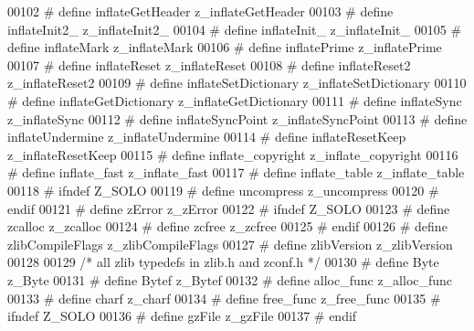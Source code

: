 \begin{DoxyCode}
00102 \textcolor{preprocessor}{#  define inflateGetHeader      z\_inflateGetHeader}
00103 \textcolor{preprocessor}{#  define inflateInit2\_         z\_inflateInit2\_}
00104 \textcolor{preprocessor}{#  define inflateInit\_          z\_inflateInit\_}
00105 \textcolor{preprocessor}{#  define inflateMark           z\_inflateMark}
00106 \textcolor{preprocessor}{#  define inflatePrime          z\_inflatePrime}
00107 \textcolor{preprocessor}{#  define inflateReset          z\_inflateReset}
00108 \textcolor{preprocessor}{#  define inflateReset2         z\_inflateReset2}
00109 \textcolor{preprocessor}{#  define inflateSetDictionary  z\_inflateSetDictionary}
00110 \textcolor{preprocessor}{#  define inflateGetDictionary  z\_inflateGetDictionary}
00111 \textcolor{preprocessor}{#  define inflateSync           z\_inflateSync}
00112 \textcolor{preprocessor}{#  define inflateSyncPoint      z\_inflateSyncPoint}
00113 \textcolor{preprocessor}{#  define inflateUndermine      z\_inflateUndermine}
00114 \textcolor{preprocessor}{#  define inflateResetKeep      z\_inflateResetKeep}
00115 \textcolor{preprocessor}{#  define inflate\_copyright     z\_inflate\_copyright}
00116 \textcolor{preprocessor}{#  define inflate\_fast          z\_inflate\_fast}
00117 \textcolor{preprocessor}{#  define inflate\_table         z\_inflate\_table}
00118 \textcolor{preprocessor}{#  ifndef Z\_SOLO}
00119 \textcolor{preprocessor}{#    define uncompress            z\_uncompress}
00120 \textcolor{preprocessor}{#  endif}
00121 \textcolor{preprocessor}{#  define zError                z\_zError}
00122 \textcolor{preprocessor}{#  ifndef Z\_SOLO}
00123 \textcolor{preprocessor}{#    define zcalloc               z\_zcalloc}
00124 \textcolor{preprocessor}{#    define zcfree                z\_zcfree}
00125 \textcolor{preprocessor}{#  endif}
00126 \textcolor{preprocessor}{#  define zlibCompileFlags      z\_zlibCompileFlags}
00127 \textcolor{preprocessor}{#  define zlibVersion           z\_zlibVersion}
00128 
00129 \textcolor{comment}{/* all zlib typedefs in zlib.h and zconf.h */}
00130 \textcolor{preprocessor}{#  define Byte                  z\_Byte}
00131 \textcolor{preprocessor}{#  define Bytef                 z\_Bytef}
00132 \textcolor{preprocessor}{#  define alloc\_func            z\_alloc\_func}
00133 \textcolor{preprocessor}{#  define charf                 z\_charf}
00134 \textcolor{preprocessor}{#  define free\_func             z\_free\_func}
00135 \textcolor{preprocessor}{#  ifndef Z\_SOLO}
00136 \textcolor{preprocessor}{#    define gzFile                z\_gzFile}
00137 \textcolor{preprocessor}{#  endif}

\end{DoxyCode}
